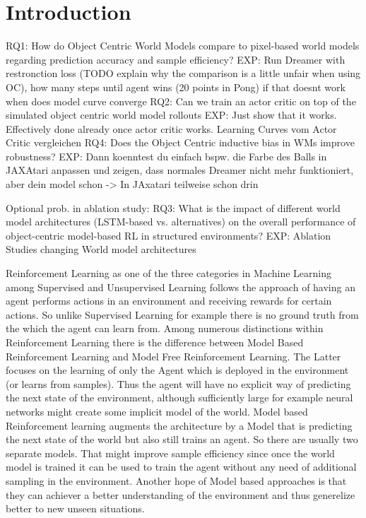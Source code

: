 \documentclass[
	english,
	ruledheaders=section,
	class=report,
	thesis={type=master},
	accentcolor=9c,
	custommargins=true,
	marginpar=false,
	parskip=half-,
	fontsize=11pt,
]{tudapub}
\begin{document}
\chapter{Introduction}	
\label{chap:introduction}
RQ1: How do Object Centric World Models compare to pixel-based world models regarding prediction accuracy and sample efficiency?
EXP: Run Dreamer with restronction loss (TODO explain why the comparison is a little unfair when using OC), how many steps until agent wins (20 points in Pong) if that doesnt work when does model curve converge
RQ2: Can we train an actor critic on top of the simulated object centric world model rollouts 
EXP: Just show that it works. Effectively done already once actor critic works. Learning Curves vom Actor Critic  vergleichen
RQ4: Does the Object Centric inductive bias in WMs improve robustness?
EXP: Dann koenntest du einfach bspw. die Farbe des Balls in JAXAtari anpassen und zeigen, dass normales Dreamer nicht mehr funktioniert, aber dein model schon -> In JAxatari teilweise schon drin

Optional prob. in ablation study:
RQ3: What is the impact of different world model architectures (LSTM-based vs. alternatives) on the overall performance of object-centric model-based RL in structured environments?
EXP: Ablation Studies changing World model architectures


Reinforcement Learning as one of the three categories in Machine Learning among Supervised and Unsupervised Learning follows the approach of having an agent performs actions in an environment and receiving rewards
for certain actions. So unlike Supervised Learning for example there is no ground truth from the which the agent can learn from. Among numerous distinctions within Reinforcement Learning there is the difference 
between Model Based Reinforcement Learning and Model Free Reinforcement Learning. The Latter focuses on the learning of only the Agent which is deployed in the environment (or learns from samples). Thus the agent
will have no explicit way of predicting the next state of the environment, although sufficiently large for example neural networks might create some implicit model of the world. Model based Reinforcement learning 
augments the architecture by a Model that is predicting the next state of the world but also still trains an agent. So there are usually two separate models. That might improve sample efficiency since once the world model
is trained it can be used to train the agent without any need of additional sampling in the environment. Another hope of Model based approaches is that they can achiever a better understanding of the environment and thus
generelize better to new unseen situations.
\end{document}
